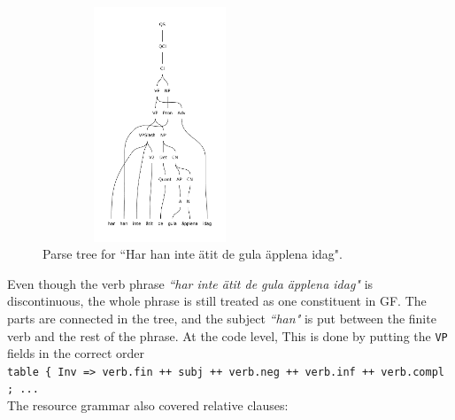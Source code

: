 \documentclass{report}
\begin{document}
\begin{figure}[h]
\includegraphics[width=70mm,height=70mm]{apples.pdf}
\caption{Parse tree for ``Har han inte ätit de gula äpplena idag".}
\label{gfSwe:parsetree}
\end{figure}
Even though the verb phrase \emph{``har inte ätit de gula äpplena idag"} is discontinuous, the whole
phrase is still treated as one constituent in GF. The parts
are connected in the tree, and the subject \emph{``han"} is put between the
finite verb and the rest of the phrase.
At the code level, This is done by putting the \verb-VP- fields in the correct order\\
\verb|table { Inv => verb.fin ++ subj ++ verb.neg ++ verb.inf ++ verb.compl ; ... | \\

The resource grammar also covered relative clauses: 
\eenumsentence{\item[a]\shortexnt{5}{Hon & ser & pojken & som  &sover}
              {\emph{she} & \emph{sees} & \emph{the boy} & \emph{who} & \emph{sleeps}}
\item[b]\shortexnt{6}{Han & ser &katten & han  &tycker & om}
              {\emph{he} & \emph{sees} & \emph{the cat} & \emph{he} & \emph{likes} &}}
\end{document}
